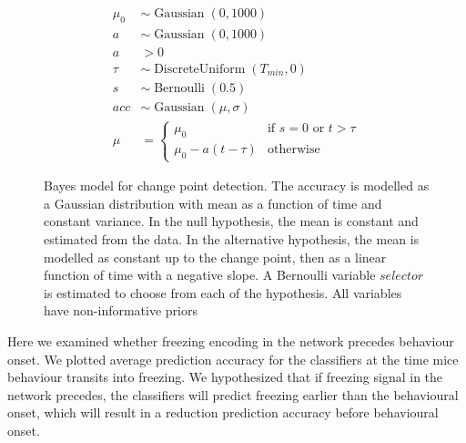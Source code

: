 \begin{figure}[h]
    \centering
    \begin{minipage}[b]{0.45\linewidth}
        
    \end{minipage}
    \begin{minipage}[b]{0.45\linewidth}
        \begin{align*}
            \mu_0 &\sim \operatorname{Gaussian}(0, 1000) \\
            a &\sim \operatorname{Gaussian}(0, 1000) \\
            a &> 0 \\
            \tau &\sim \operatorname{DiscreteUniform}(T_{min}, 0) \\
            s &\sim \operatorname{Bernoulli}(0.5) \\
            acc &\sim \operatorname{Gaussian}(\mu, \sigma) \\
            \mu &=
                \begin{cases}
                    \mu_0 & \text{if }s=0\text{ or }t>\tau \\
                    \mu_0 - a(t-\tau) & \text{otherwise}
                \end{cases}
        \end{align*}
    \end{minipage}
    \caption{Bayes model for change point detection. The accuracy is modelled as a Gaussian distribution with mean as a function of time and constant variance. In the null hypothesis, the mean is constant and estimated from the data. In the alternative hypothesis, the mean is modelled as constant up to the change point, then as a linear function of time with a negative slope. A Bernoulli variable $selector$ is estimated to choose from each of the hypothesis. All variables have non-informative priors \label{f.ad.bayesmodel}}
\end{figure}

Here we examined whether freezing encoding in the network precedes behaviour onset.  We plotted average prediction accuracy for the classifiers at the time mice behaviour transits into freezing. We hypothesized that if freezing signal in the network precedes, the classifiers will predict freezing earlier than the behavioural onset, which will result in a reduction prediction accuracy before behavioural onset.

